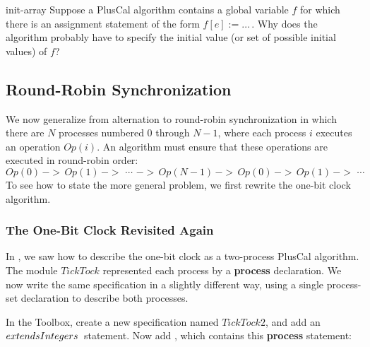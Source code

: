 \documentclass[fleqn,leqno]{article}
\begin{document}
\begin{aquestion}{init-array}
Suppose a PlusCal algorithm contains a global variable $f$ for which
there is an assignment statement of the form $f[e] := \ldots$\,.  Why
does the algorithm probably have to specify the initial value (or set
of possible initial values) of $f$?
\end{aquestion}


\subsection{Round-Robin Synchronization} 

We now generalize from alternation to round-robin synchronization in
which there are $N$ processes numbered 0 through $N-1$, where each
process $i$ executes an operation $Op(i)$.  An algorithm must ensure
that these operations are executed in round-robin order:
 \[ Op(0) \,->\, Op(1) \,->\, \,\cdots\, \,->\, Op(N-1) \,->\, 
Op(0) \,->\, Op(1) \,->\, \,\cdots \]
To see how to state the more general problem, we first rewrite
the one-bit clock algorithm.

\subsubsection{The One-Bit Clock Revisited Again}

In ,
we saw how to describe the one-bit clock as a two-process PlusCal
algorithm.  The module $TickTock$ represented each process by a
\textbf{process} declaration.  We now write the same specification
in a slightly different way, using a single process-set declaration
to describe both processes.

In the Toolbox, create a new specification named $TickTock2$, and
add an \,$\EXTENDS Integers$\, statement.
% 
%
Now add , which
contains this \textbf{process} statement:
\end{document}
